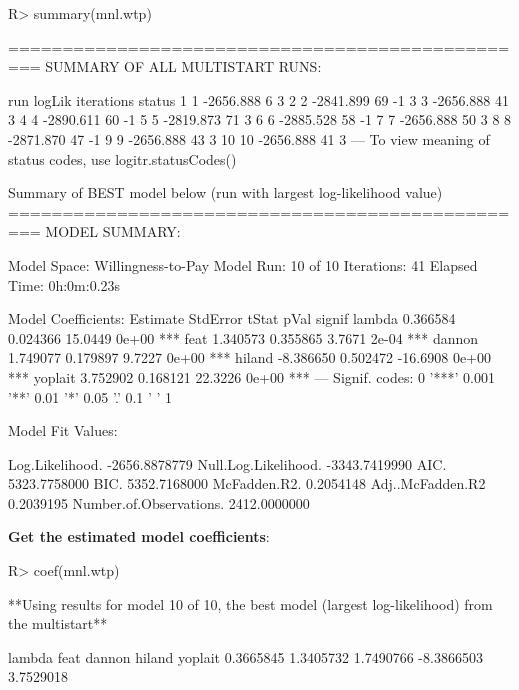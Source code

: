 \documentclass[article]{jss}
\begin{document}
\begin{CodeChunk}

\begin{CodeInput}
R> summary(mnl.wtp)
\end{CodeInput}

\begin{CodeOutput}
=================================================
SUMMARY OF ALL MULTISTART RUNS:

   run    logLik iterations status
1    1 -2656.888          6      3
2    2 -2841.899         69     -1
3    3 -2656.888         41      3
4    4 -2890.611         60     -1
5    5 -2819.873         71      3
6    6 -2885.528         58     -1
7    7 -2656.888         50      3
8    8 -2871.870         47     -1
9    9 -2656.888         43      3
10  10 -2656.888         41      3
---
To view meaning of status codes, use logitr.statusCodes() 

Summary of BEST model below (run with largest log-likelihood value)
=================================================
MODEL SUMMARY: 
                                
Model Space:  Willingness-to-Pay
Model Run:              10 of 10
Iterations:                   41
Elapsed Time:        0h:0m:0.23s

Model Coefficients: 
         Estimate StdError    tStat  pVal signif
lambda   0.366584 0.024366  15.0449 0e+00    ***
feat     1.340573 0.355865   3.7671 2e-04    ***
dannon   1.749077 0.179897   9.7227 0e+00    ***
hiland  -8.386650 0.502472 -16.6908 0e+00    ***
yoplait  3.752902 0.168121  22.3226 0e+00    ***
---
Signif. codes:  0 '***' 0.001 '**' 0.01 '*' 0.05 '.' 0.1 ' ' 1

Model Fit Values: 
                                     
Log.Likelihood.         -2656.8878779
Null.Log.Likelihood.    -3343.7419990
AIC.                     5323.7758000
BIC.                     5352.7168000
McFadden.R2.                0.2054148
Adj..McFadden.R2            0.2039195
Number.of.Observations.  2412.0000000
\end{CodeOutput}
\end{CodeChunk}

\textbf{Get the estimated model coefficients}:

\begin{CodeChunk}

\begin{CodeInput}
R> coef(mnl.wtp)
\end{CodeInput}

\begin{CodeOutput}
**Using results for model 10 of 10,
the best model (largest log-likelihood) from the multistart**
\end{CodeOutput}

\begin{CodeOutput}
    lambda       feat     dannon     hiland    yoplait 
 0.3665845  1.3405732  1.7490766 -8.3866503  3.7529018 
\end{CodeOutput}
\end{CodeChunk}
\end{document}
